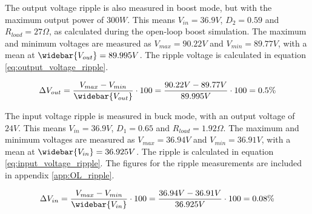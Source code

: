 The output voltage ripple is also measured in boost mode, but with the maximum output power of $300W$. This means $V_{in} = 36.9V$, $D_{2} = 0.59$ and $R_{load} = 27\Omega$, as calculated during the open-loop boost simulation. The maximum and minimum voltages are measured as $V_{max} = 90.22V$ and $V_{min} = 89.77V$, with a mean at $\widebar{V_{out}} = 89.995V$. The ripple voltage is calculated in equation \ref{eq:output_voltage_ripple}.

\begin{equation} \label{eq:output_voltage_ripple}
\Delta V_{out} = \frac{V_{max}-V_{min}}{\widebar{V_{out}}} \cdot 100 = \frac{90.22V-89.77V}{89.995V} \cdot 100 = 0.5\%
\end{equation}

The input voltage ripple is measured in buck mode, with an output voltage of $24V$. This means $V_{in} = 36.9V$, $D_{1} = 0.65$ and $R_{load} = 1.92\Omega$. The maximum and minimum voltages are measured as $V_{max} = 36.94V$ and $V_{min} = 36.91V$, with a mean at $\widebar{V_{in}} = 36.925V$. The ripple is calculated in equation \ref{eq:input_voltage_ripple}. The figures for the ripple measurements are included in appendix \ref{app:OL_ripple}.

\begin{equation} \label{eq:input_voltage_ripple}
\Delta V_{in} = \frac{V_{max}-V_{min}}{\widebar{V_{in}}} \cdot 100 = \frac{36.94V-36.91V}{36.925V} \cdot 100 = 0.08\%
\end{equation}



